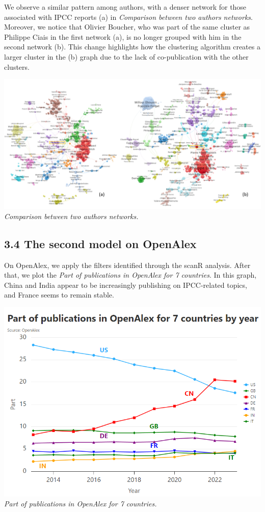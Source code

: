 \documentclass[
]{article}
\begin{document}
We observe a similar pattern among authors, with a denser network for
those associated with IPCC reports (a) in \emph{Comparison between two
authors networks}. Moreover, we notice that Olivier Boucher, who was
part of the same cluster as Philippe Ciais in the first network (a), is
no longer grouped with him in the second network (b). This change
highlights how the clustering algorithm creates a larger cluster in the
(b) graph due to the lack of co-publication with the other clusters.

\includegraphics{./images/teds_network_authors2.png} \emph{Comparison
between two authors networks.}

\hypertarget{the-second-model-on-openalex}{%
\subsection{3.4 The second model on
OpenAlex}\label{the-second-model-on-openalex}}

On OpenAlex, we apply the filters identified through the scanR analysis.
After that, we plot the \emph{Part of publications in OpenAlex for 7
countries}. In this graph, China and India appear to be increasingly
publishing on IPCC-related topics, and France seems to remain stable.

\includegraphics{./images/teds_OA_part7.png} \emph{Part of publications
in OpenAlex for 7 countries.}
\end{document}
